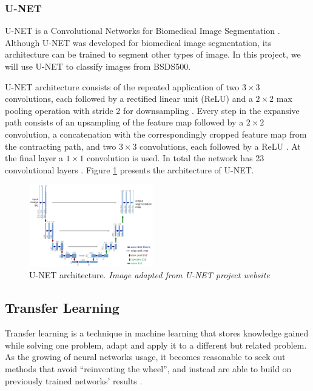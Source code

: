\documentclass[10pt,twocolumn,letterpaper]{article}
\begin{document}
\subsubsection{U-NET} \label{sssec:unet}

U-NET is a Convolutional Networks for Biomedical Image Segmentation \cite{UNET} \cite{UNET_WEBSITE}. Although U-NET was developed for biomedical image segmentation, its architecture can be trained to segment other types of image. In this project, we will use U-NET to classify images from BSDS500.

U-NET architecture consists of the repeated application of two $3 \times 3$ convolutions, each followed by a rectified linear unit (ReLU) and a $2 \times 2$ max pooling operation with stride 2 for downsampling \cite{UNET}. Every step in the expansive path consists of an upsampling of the feature map followed by a $2 \times 2$ convolution, a concatenation with the correspondingly cropped feature map from the contracting path, and two $3 \times 3$ convolutions, each followed by a ReLU \cite{UNET}. At the final layer a $1 \times 1$ convolution is used. In total the network has 23 convolutional layers \cite{UNET}. Figure \ref{fig:unet} presents the  architecture of U-NET.

\begin{figure}[ht]
  \centering
  \includegraphics[width=0.48\textwidth]{unet.png}
  \caption{U-NET architecture. \textit{Image adapted from U-NET project website} \cite{UNET_WEBSITE} \cite{UNET}}
  \label{fig:unet}
\end{figure}

\subsection{Transfer Learning} \label{ssec:transfer_learning}

Transfer learning is a technique in machine learning that stores knowledge gained while solving one problem, adapt and apply it to a different but related problem. As the growing of neural networks usage, it becomes reasonable to seek out methods that avoid ``reinventing the wheel'', and instead are able to build on previously trained networks' results \cite{PRATT} \cite{WEISS2016}.
\end{document}
